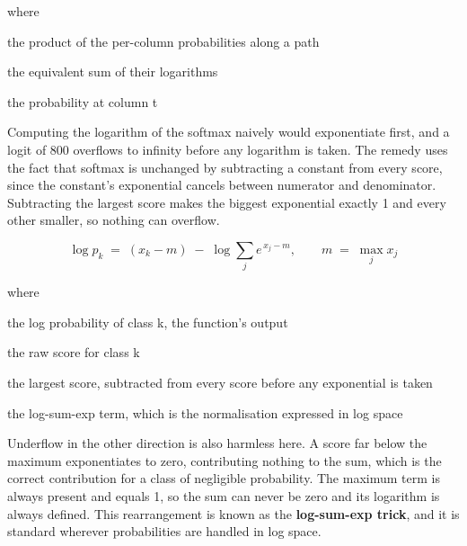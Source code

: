 \noindent where
\begin{description}[leftmargin=2.4em,style=nextline,font=\normalfont\ttfamily]\setlength\itemsep{1pt}
  \item[{$\prod_{t} p_{t}$}] \normalfont the product of the per-column probabilities along a path
  \item[{$\sum_{t} \log p_{t}$}] \normalfont the equivalent sum of their logarithms
  \item[{$p_t$}] \normalfont the probability at column t
\end{description}

Computing the logarithm of the softmax naively would exponentiate first, and a logit of 800 overflows to infinity before any logarithm is taken. The remedy uses the fact that softmax is unchanged by subtracting a constant from every score, since the constant's exponential cancels between numerator and denominator. Subtracting the largest score makes the biggest exponential exactly 1 and every other smaller, so nothing can overflow.


\begin{equation}
\log p_{k} \;=\; (x_{k} - m) \;-\; \log \sum_{j} e^{\,x_{j} - m}, \qquad m \;=\; \max_{j} x_{j}
\end{equation}

\noindent where
\begin{description}[leftmargin=2.4em,style=nextline,font=\normalfont\ttfamily]\setlength\itemsep{1pt}
  \item[{$\log p_k$}] \normalfont the log probability of class k, the function's output
  \item[{$x_k$}] \normalfont the raw score for class k
  \item[{$m$}] \normalfont the largest score, subtracted from every score before any exponential is taken
  \item[{$\log \sum_j e^{x_j - m}$}] \normalfont the log-sum-exp term, which is the normalisation expressed in log space
\end{description}
Underflow in the other direction is also harmless here. A score far below the maximum exponentiates to zero, contributing nothing to the sum, which is the correct contribution for a class of negligible probability. The maximum term is always present and equals 1, so the sum can never be zero and its logarithm is always defined. This rearrangement is known as the \textbf{log-sum-exp trick}, and it is standard wherever probabilities are handled in log space.



